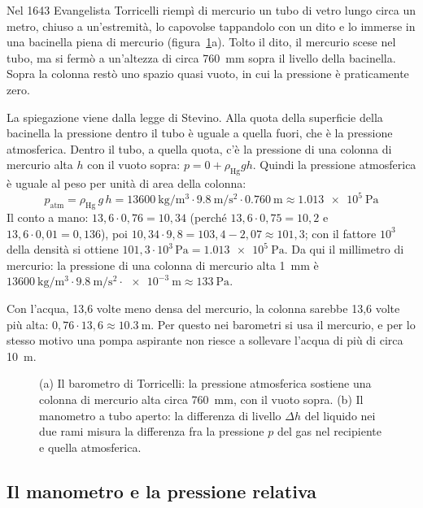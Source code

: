 Nel 1643 Evangelista Torricelli riempì di mercurio un tubo di vetro lungo circa un metro, chiuso a un'estremità, lo capovolse tappandolo con un dito e lo immerse in una bacinella piena di mercurio (figura~\ref{fig:ud3-misura}a). Tolto il dito, il mercurio scese nel tubo, ma si fermò a un'altezza di circa \SI{760}{\milli\metre} sopra il livello della bacinella. Sopra la colonna restò uno spazio quasi vuoto, in cui la pressione è praticamente zero.

La spiegazione viene dalla legge di Stevino. Alla quota della superficie della bacinella la pressione dentro il tubo è uguale a quella fuori, che è la pressione atmosferica. Dentro il tubo, a quella quota, c'è la pressione di una colonna di mercurio alta $h$ con il vuoto sopra: $p = 0 + \rho_\text{Hg} g h$. Quindi la pressione atmosferica è uguale al peso per unità di area della colonna:
\[
  p_\text{atm} = \rho_\text{Hg}\,g\,h = \SI{13600}{\kilo\gram\per\metre\cubed} \cdot \SI{9,8}{\metre\per\second\squared} \cdot \SI{0,760}{\metre} \approx \SI{1,013e5}{\pascal}
\]
Il conto a mano: $13{,}6 \cdot 0{,}76 = 10{,}34$ (perché $13{,}6 \cdot 0{,}75 = 10{,}2$ e $13{,}6 \cdot 0{,}01 = 0{,}136$), poi $10{,}34 \cdot 9{,}8 = 103{,}4 - 2{,}07 \approx 101{,}3$; con il fattore $10^{3}$ della densità si ottiene $101{,}3 \cdot 10^{3}\,\si{\pascal} = \SI{1,013e5}{\pascal}$. Da qui il millimetro di mercurio: la pressione di una colonna di mercurio alta \SI{1}{\milli\metre} è $\SI{13600}{\kilo\gram\per\metre\cubed} \cdot \SI{9,8}{\metre\per\second\squared} \cdot \SI{e-3}{\metre} \approx \SI{133}{\pascal}$.

Con l'acqua, 13,6 volte meno densa del mercurio, la colonna sarebbe 13,6 volte più alta: $0{,}76 \cdot 13{,}6 \approx \SI{10,3}{\metre}$. Per questo nei barometri si usa il mercurio, e per lo stesso motivo una pompa aspirante non riesce a sollevare l'acqua di più di circa \SI{10}{\metre}.

\begin{figure}[h]
\centering

\caption{(a) Il barometro di Torricelli: la pressione atmosferica sostiene una colonna di mercurio alta circa \SI{760}{\milli\metre}, con il vuoto sopra. (b) Il manometro a tubo aperto: la differenza di livello $\Delta h$ del liquido nei due rami misura la differenza fra la pressione $p$ del gas nel recipiente e quella atmosferica.}
\label{fig:ud3-misura}
\end{figure}

\subsection{Il manometro e la pressione relativa}

